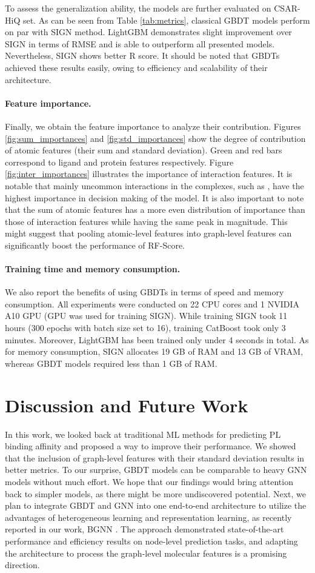 \documentclass[nohyperref]{article}
\theoremstyle{plain}
\theoremstyle{definition}
\theoremstyle{remark}
\begin{document}
To assess the generalization ability, the models are further evaluated on CSAR-HiQ set. As can be seen from Table \ref{tab:metrics}, classical GBDT models perform on par with SIGN method. LightGBM demonstrates slight improvement over SIGN in terms of RMSE and is able to outperform all presented models. Nevertheless, SIGN shows better R score. It should be noted that GBDTs achieved these results easily, owing to efficiency and scalability of their architecture. 
\paragraph{Feature importance.}
Finally, we obtain the feature importance to analyze their contribution. Figures \ref{fig:sum_importances} and \ref{fig:std_importances} show the degree of contribution of atomic features (their sum and standard deviation). Green and red bars correspond to ligand and protein features respectively. Figure \ref{fig:inter_importances} illustrates the importance of interaction features. It is notable that mainly uncommon interactions in the complexes, such as ,  have the highest importance in decision making of the model. It is also important to note that the sum of atomic features has a more even distribution of importance than those of interaction features while having the same peak in magnitude. This might suggest that pooling atomic-level features into graph-level features can significantly boost the performance of RF-Score.  
\paragraph{Training time and memory consumption.}
\label{par:training}
We also report the benefits of using GBDTs in terms of speed and memory consumption. All experiments were conducted on 22 CPU cores and 1 NVIDIA A10 GPU (GPU was used for training SIGN). While training SIGN took 11 hours (300 epochs with batch size set to 16), training CatBoost took only 3 minutes. Moreover, LightGBM has been trained only under 4 seconds in total. As for memory consumption, SIGN allocates 19 GB of RAM and 13 GB of VRAM, whereas GBDT models required less than 1 GB of RAM.

\section{Discussion and Future Work}
In this work, we looked back at traditional ML methods for predicting PL binding affinity and proposed a way to improve their performance. We showed that the inclusion of graph-level features with their standard deviation results in better metrics. To our surprise, GBDT models can be comparable to heavy GNN models without much effort. We hope that our findings would bring attention back to simpler models, as there might be more undiscovered potential. 
Next, we plan to integrate GBDT and GNN into one end-to-end architecture to utilize the advantages of heterogeneous learning and representation learning, as recently reported in our work, BGNN \cite{ivanov2021}. The approach demonstrated state-of-the-art performance and efficiency results on node-level prediction tasks, and adapting the architecture to process the graph-level molecular features is a promising direction.



\end{document}
